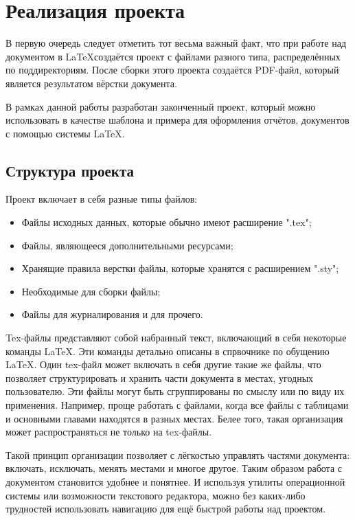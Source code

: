 \section{ Реализация проекта}
	В первую очередь следует отметить тот весьма важный факт, что при работе над документом в \LaTeX создаётся проект
	с файлами разного типа, распределённых по поддиректориям. После сборки этого проекта создаётся PDF-файл, который
	является результатом вёрстки документа\cite{norm2}.

	В рамках данной работы разработан законченный проект, который можно использовать в качестве шаблона и примера
	для оформления отчётов, документов с помощью системы \LaTeX.

	\subsection{Структура проекта}
		Проект включает в себя разные типы  файлов:
			\begin{itemize}
				\fontsize{0pt}{0pt}
				\setlength{\itemsep}{0pt}
				\item Файлы исходных данных, которые обычно имеют расширение ".tex"; 
				\item Файлы, являющееся дополнительными ресурсами;
				\item Хранящие правила верстки файлы, которые хранятся с расширением ".sty";
				\item Необходимые для сборки файлы;
				\item Файлы для журналирования и для прочего.
			\end{itemize}

			Tex-файлы представляют собой набранный текст, включающий в себя некоторые команды \LaTeX. Эти команды детально описаны
			в спрвочнике по обущению \LaTeX \cite{norm3}. Один tex-файл может включать в себя другие такие же файлы, что позволяет структурировать и хранить 
			части документа в местах, угодных пользователю. Эти файлы могут быть сгруппированы по смыслу или по виду их 
			применения. Например, проще работать с файлами, когда все файлы с таблицами и основными главами находятся в
			разных местах. Белее того, такая организация может распространяться не только на tex-файлы.

			Такой принцип организации позволяет с лёгкостью управлять частями документа: включать, исключать, менять местами и многое другое.
			Таким образом работа с документом становится удобнее и понятнее. И используя утилиты операционной системы или возможности
			текстового редактора, можно без каких-либо трудностей использовать навигацию для ещё быстрой работы над проектом.

